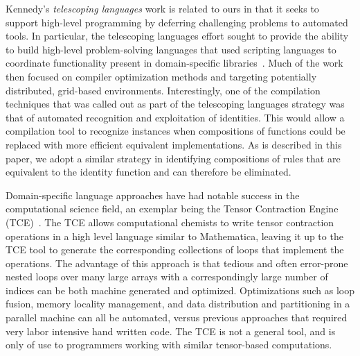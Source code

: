 Kennedy's \emph{telescoping languages} work is related to ours in that it seeks
to support high-level programming by deferring challenging problems to automated
tools. In particular, the telescoping languages effort sought to provide the
ability to build high-level problem-solving languages that used scripting
languages to coordinate functionality present in domain-specific
libraries~\cite{kennedy00telescoping}. Much of the work then focused on compiler
optimization methods and targeting potentially distributed, grid-based
environments. Interestingly, one of the compilation techniques that was called
out as part of the telescoping languages strategy was that of automated
recognition and exploitation of identities. This would allow a compilation tool
to recognize instances when compositions of functions could be replaced with
more efficient equivalent implementations. As is described in this paper, we
adopt a similar strategy in identifying compositions of rules that are
equivalent to the identity function and can therefore be eliminated.

Domain-specific language approaches have had notable success in the
computational science field, an exemplar being the Tensor Contraction Engine
(TCE)~\cite{baumgartner05synthesis}. The TCE allows computational chemists to
write tensor contraction operations in a high level language similar to
Mathematica, leaving it up to the TCE tool to generate the corresponding
collections of loops that implement the operations. The advantage of this
approach is that tedious and often error-prone nested loops over many large
arrays with a correspondingly large number of indices can be both machine
generated and optimized. Optimizations such as loop fusion, memory locality
management, and data distribution and partitioning in a parallel machine can all
be automated, versus previous approaches that required very labor intensive hand
written code. The TCE is not a general tool, and is only of use to programmers
working with similar tensor-based computations.


% 
% 
% 
% 
